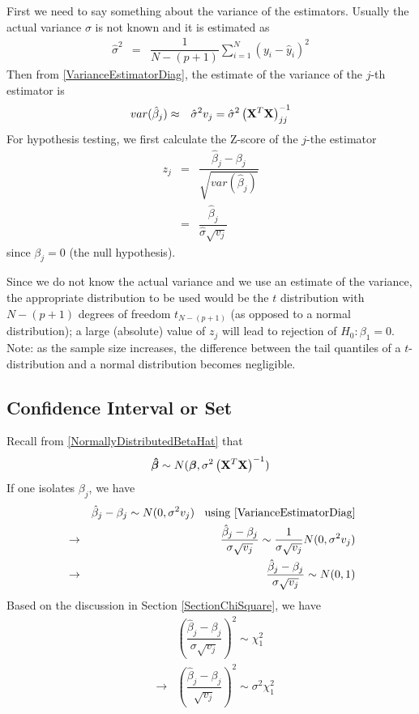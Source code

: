 \documentclass[11pt]{article}
\theoremstyle{remark}
\begin{document}
First we need to say something about the variance of the estimators. Usually the actual variance $\sigma$ is not known and it is estimated as
\begin{eqnarray}
\hat{\sigma}^2 &=&\dfrac{1}{N-(p+1)}\sum_{i=1}^N(y_i-\hat{y}_i)^2
\end{eqnarray}
Then from \eqref{VarianceEstimatorDiag}, the estimate of the variance of the $j$-th estimator is
\begin{eqnarray}
var(\hat{\beta}_j) &\approx& \hat{\sigma}^2 v_j = \hat{\sigma}^2 \left(\bold{X}^T\bold{X}\right)^{-1}_{jj}\label{VarianceEstimatorDiagEstimate}
\end{eqnarray}
For hypothesis testing, we first calculate the Z-score of the $j$-the estimator
\begin{eqnarray}
z_j &=&\dfrac{\hat{\beta}_j - \beta_j}{\sqrt{var(\hat{\beta}_j)}}\nonumber\\
&=&\dfrac{\hat{\beta}_j}{\hat{\sigma} \sqrt{v_j}}
\end{eqnarray}
since $\beta_j = 0$ (the null hypothesis).

Since we do not know the actual variance and we use an estimate of the variance, the appropriate distribution to be used would be the $t$ distribution with $N-(p+1)$ degrees of freedom $t_{N-(p+1)}$ (as opposed to a normal distribution); a large (absolute) value of $z_j$ will lead to rejection of $H_0: \beta_1 = 0$. Note: as the sample size increases, the difference between the tail quantiles of a $t$-distribution and a normal distribution becomes negligible.


\subsection{Confidence Interval or Set}
Recall from \eqref{NormallyDistributedBetaHat} that
\begin{eqnarray}
\boldsymbol{\hat{\beta}}\sim N(\boldsymbol{\beta},\sigma^2 \left(\bold{X}^T\bold{X}\right)^{-1})
\end{eqnarray}
If one isolates $\beta_j$, we have
\begin{eqnarray}
&&\hat{\beta}_j - \beta_j \sim N(0,\sigma^2 v_j )\:\:\:\:\text{using \eqref{VarianceEstimatorDiag}}\nonumber\\
&\rightarrow&\dfrac{\hat{\beta}_j - \beta_j}{\sigma \sqrt{v_j}} \sim \dfrac{1}{\sigma \sqrt{v_j}}N(0,\sigma^2 v_j )\nonumber\\
&\rightarrow&\dfrac{\hat{\beta}_j - \beta_j}{\sigma \sqrt{v_j}} \sim N(0,1)
\end{eqnarray}
Based on the discussion in Section \ref{SectionChiSquare}, we have
\begin{eqnarray}
&&\left(\dfrac{\hat{\beta}_j - \beta_j}{\sigma \sqrt{v_j}}\right)^2 \sim \chi_1^2\nonumber\\
&\rightarrow&\left(\dfrac{\hat{\beta}_j - \beta_j}{\sqrt{v_j}}\right)^2 \sim \sigma^2\chi_1^2
\end{eqnarray}


\end{document}
